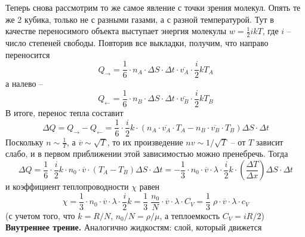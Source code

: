 \documentclass[12pt,epsfig,color,russian]{article}
\begin{document}
Теперь снова рассмотрим то же самое явление с точки зрения молекул. Опять те же 2 кубика, только не с разными газами, а с разной температурой. Тут в качестве переносимого объекта выступает энергия молекулы $w=\frac12ikT$, где $i$ -- число степеней свободы. Повторив все выкладки, получим, что направо переносится\vspace{-5mm}
\begin{displaymath}
Q_\rightarrow =
\frac16\cdot n_A\cdot \Delta S\cdot \Delta t\cdot\overline{v_A}\cdot\frac i2kT_A
\end{displaymath}
а налево -- \vspace{-3mm}
\begin{displaymath}
Q_\leftarrow =
\frac16\cdot n_B\cdot \Delta S\cdot \Delta t\cdot\overline{v_B}\cdot\frac i2kT_B
\end{displaymath}
В итоге, перенос тепла составит\vspace{-3mm}
\begin{displaymath}
\Delta Q=Q_\rightarrow-Q_\leftarrow =
\frac16\cdot\frac i2k \cdot\left(n_A\cdot\overline{v_A}\cdot T_A - n_B\cdot\overline{v_B}\cdot T_B \right) \Delta S\cdot \Delta t
\end{displaymath}
Поскольку $n\sim\frac1T$, а $\overline{v}\sim\sqrt{T}$, то их произведение $nv\sim1/\sqrt{T}$ -- от $T$ зависит слабо, и в первом приближении этой зависимостью можно пренебречь. Тогда\vspace{-3mm}
\begin{displaymath}
\Delta Q=
\frac16\cdot\frac i2k \cdot n_0\cdot\overline{v}\cdot \left(T_A - T_B \right) \Delta S\cdot \Delta t=-\frac13\cdot n_0\cdot\overline{v}\cdot\lambda\cdot\frac i2k \cdot \left(\frac{\Delta T}{\Delta x} \right)\Delta S\cdot \Delta t
\end{displaymath}
и коэффициент теплопроводности $\chi$ равен
\begin{displaymath}
\chi=\frac13\cdot n_0\cdot\overline{v}\cdot\lambda\cdot\frac i2k =
\frac13\;\frac{n_0}N\cdot\overline{v}\cdot\lambda\cdot C_V=
\frac13\;\rho\cdot\overline{v}\cdot\lambda\cdot c_V
\end{displaymath}
(с учетом того, что $k=R/N$, $n_0/N=\rho/\mu$, а теплоемкость $C_V=iR/2$)
\newpage
\noindent
{\bf Внутреннее трение.} Аналогично жидкостям: слой, который движется \\
\end{document}
